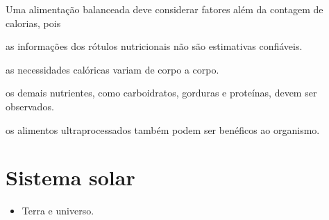 Uma alimentação balanceada deve considerar fatores além da contagem de
calorias, pois

\begin{escolha}
\item as informações dos rótulos nutricionais não são estimativas confiáveis.

\item as necessidades calóricas variam de corpo a corpo.

\item os demais nutrientes, como carboidratos, gorduras e proteínas, devem ser observados.

\item os alimentos ultraprocessados também podem ser benéficos ao organismo.
\end{escolha}


\chapter{Sistema solar}


\begin{itemize}
	\item Terra e universo.
\end{itemize}


